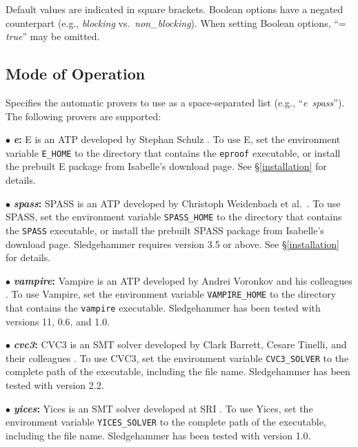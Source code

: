 \documentclass[a4paper,12pt]{article}
\begin{document}
Default values are indicated in square brackets. Boolean options have a negated
counterpart (e.g., \textit{blocking} vs.\ \textit{non\_blocking}). When setting
Boolean options, ``= \textit{true}'' may be omitted.

\subsection{Mode of Operation}
\label{mode-of-operation}

\begin{enum}
Specifies the automatic provers to use as a space-separated list (e.g.,
``\textit{e}~\textit{spass}''). The following provers are supported:

\begin{enum}
\item[$\bullet$] \textbf{\textit{e}:} E is an ATP developed by Stephan Schulz
\cite{schulz-2002}. To use E, set the environment variable
\texttt{E\_HOME} to the directory that contains the \texttt{eproof} executable,
or install the prebuilt E package from Isabelle's download page. See
\S\ref{installation} for details.

\item[$\bullet$] \textbf{\textit{spass}:} SPASS is an ATP developed by Christoph
Weidenbach et al.\ \cite{weidenbach-et-al-2009}. To use SPASS, set the
environment variable \texttt{SPASS\_HOME} to the directory that contains the
\texttt{SPASS} executable, or install the prebuilt SPASS package from Isabelle's
download page. Sledgehammer requires version 3.5 or above. See
\S\ref{installation} for details.

\item[$\bullet$] \textbf{\textit{vampire}:} Vampire is an ATP developed by
Andrei Voronkov and his colleagues \cite{riazanov-voronkov-2002}. To use
Vampire, set the environment variable \texttt{VAMPIRE\_HOME} to the directory
that contains the \texttt{vampire} executable. Sledgehammer has been tested with
versions 11, 0.6, and 1.0.

\item[$\bullet$] \textbf{\textit{cvc3}:} CVC3 is an SMT solver developed by
Clark Barrett, Cesare Tinelli, and their colleagues \cite{cvc3}. To use CVC3,
set the environment variable \texttt{CVC3\_SOLVER} to the complete path of the
executable, including the file name. Sledgehammer has been tested with version
2.2.

\item[$\bullet$] \textbf{\textit{yices}:} Yices is an SMT solver developed at
SRI \cite{yices}. To use Yices, set the environment variable
\texttt{YICES\_SOLVER} to the complete path of the executable, including the
file name. Sledgehammer has been tested with version 1.0.


\end{enum}
\end{enum}
\end{document}
